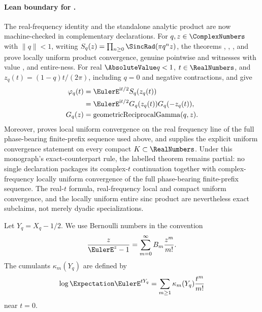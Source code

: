 \documentclass[11pt,a4paper,oneside,openany]{book}
\theoremstyle{definition}
\theoremstyle{remark}
\begin{document}
\paragraph{Lean boundary for .}
The real-frequency identity and the standalone analytic product are now
machine-checked in complementary declarations.  For $q,z\in\ComplexNumbers$ with
$\lVert q\rVert<1$, writing
$S_q(z)=\prod_{n\ge0}\SincRad(\pi q^nz)$, the theorems
,
,
, and
 prove locally uniform product
convergence, genuine pointwise  and  witnesses
with value , and entire-ness.  For real
$\AbsoluteValue q<1$, $t\in\RealNumbers$, and $z_q(t)=(1-q)t/(2\pi)$, including $q=0$ and
negative contractions,
and
give
\[
\begin{aligned}
 \varphi_q(t)
   &=\EulerE^{\mathrm i t/2}S_q(z_q(t)) \\
   &=\EulerE^{\mathrm i t/2}G_q(z_q(t))G_q(-z_q(t)), \\
 G_q(z)&=\operatorname{geometricReciprocalGamma}(q,z).
\end{aligned}
\]
Moreover,  proves local
uniform convergence on the real frequency line of the full phase-bearing
finite-prefix sequence used above, and
 supplies the explicit uniform
convergence statement on every compact \(K\subset\RealNumbers\).
Under this monograph's exact-counterpart rule, the labelled theorem remains
partial: no single declaration packages its complex-$t$ continuation together
with complex-frequency locally uniform convergence of the full phase-bearing
finite-prefix sequence.  The real-$t$ formula, real-frequency local and
compact uniform convergence, and the locally uniform entire sinc product are
nevertheless exact subclaims, not merely dyadic specializations.

Let $Y_q=X_q-1/2$.  We use Bernoulli numbers in the convention
\begin{equation}\label{eq:bernoulli-convention-fabius}
 \frac{z}{\EulerE^z-1}=\sum_{m=0}^{\infty}B_m\frac{z^m}{m!}.
\end{equation}
The cumulants $\kappa_m(Y_q)$ are defined by
\[
 \log\Expectation \EulerE^{tY_q}
 =\sum_{m\ge1}\kappa_m(Y_q)\frac{t^m}{m!}
\]
near $t=0$.
\end{document}
